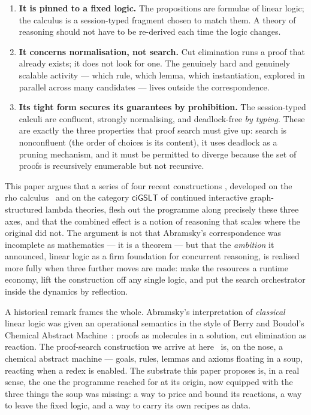 \documentclass[11pt]{article}
\theoremstyle{definition}
\theoremstyle{plain}
\newcommand{\ciGSLT}{\mathsf{ciGSLT}}
\begin{document}
\begin{enumerate}[label=(\roman*),leftmargin=2.2em]
\item \textbf{It is pinned to a fixed logic.} The propositions are
formulae of linear logic; the calculus is a session-typed fragment chosen to
match them. A theory of reasoning should not have to be re-derived each time the
logic changes.
\item \textbf{It concerns normalisation, not search.} Cut elimination runs a
proof that already exists; it does not look for one. The genuinely hard and
genuinely scalable activity --- which rule, which lemma, which instantiation,
explored in parallel across many candidates --- lives outside the
correspondence.
\item \textbf{Its tight form secures its guarantees by prohibition.} The
session-typed calculi are confluent, strongly normalising, and deadlock-free
\emph{by typing}. These are exactly the three properties that proof search
must give up: search is nonconfluent (the order of choices is its content), it
uses deadlock as a pruning mechanism, and it must be permitted to diverge
because the set of proofs is recursively enumerable but not recursive.
\end{enumerate}

This paper argues that a series of four recent constructions
\cite{NoteI,NoteII,NoteIII,NoteIV}, developed on the rho
calculus~\cite{MeredithRadestock05} and on the category $\ciGSLT$ of continued
interactive graph-structured lambda theories, flesh out the programme along
precisely these three axes, and that the combined effect is a notion of
reasoning that scales where the original did not. The argument is not that
Abramsky's correspondence was incomplete as mathematics --- it is a theorem ---
but that the \emph{ambition} it announced, linear logic as a firm foundation for
concurrent reasoning, is realised more fully when three further moves are made:
make the resources a runtime economy, lift the construction off any single
logic, and put the search orchestrator inside the dynamics by reflection.

A historical remark frames the whole. Abramsky's interpretation of
\emph{classical} linear logic was given an operational semantics in the style of
Berry and Boudol's Chemical Abstract Machine~\cite{BerryBoudol92}: proofs as
molecules in a solution, cut elimination as reaction. The proof-search
construction we arrive at here~\cite{NoteIV} is, on the nose, a chemical
abstract machine --- goals, rules, lemmas and axioms floating in a soup,
reacting when a redex is enabled. The substrate this paper proposes is, in a
real sense, the one the programme reached for at its origin, now equipped with
the three things the soup was missing: a way to price and bound its reactions,
a way to leave the fixed logic, and a way to carry its own recipes as data.
\end{document}
